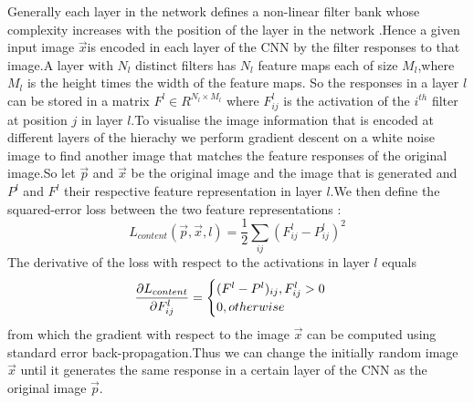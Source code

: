 \documentclass[10pt,a4paper]{ctexart}
\begin{document}
	Generally each layer in the network defines a non-linear filter bank whose 
	complexity increases with the position of the layer in the network .Hence a given input image $\overrightarrow{x}$is encoded in each layer of the CNN by the filter responses to that image.A layer with $N_l$ distinct filters has
	$N_l$ feature maps each of size $M_l$,where $M_l$ is the height times 
	the width of the feature maps. So the responses in a layer $l$ can be stored in a matrix $F^l \in R^{N_l\times M_l}$ where $F_{ij}^{l}$ is the 
	activation of the $i^{th}$ filter at position $j$ in layer $l$.To visualise
	the image information that is encoded at different layers of the hierachy we perform gradient descent on a white noise image to find another image 
	that matches the feature responses of the original image.So let $\overrightarrow{p}$ and $\overrightarrow{x}$ be the original image and the image that is generated and $P^l$ and $F^l$ their respective feature 
	representation in layer $l$.We then define the squared-error loss between the two feature representations :
	\begin{equation}
	L_{content} (\overrightarrow{p},\overrightarrow{x},l)= \frac{1}{2} \sum_{ij}
	(F_{ij}^{l}-P_{ij}^{l})^2
	\end{equation}
	The derivative of the loss with respect to the activations in layer $l$
	equals
	\begin{eqnarray}
	\dfrac{\partial L_{content}}{\partial F_{ij}^l}=\begin{cases}
	(F^l-P^l)_{ij} ,F_{ij}^l>0 \cr 0,otherwise
	\end{cases}
	\end{eqnarray}
	from which the gradient with respect to the image $\overrightarrow{x}$ can be computed using standard error back-propagation.Thus we can change the initially random image $\overrightarrow{x}$ until it generates the 
	same response in a certain layer of the CNN as the original image $\overrightarrow{p}$.
	
\end{document}
